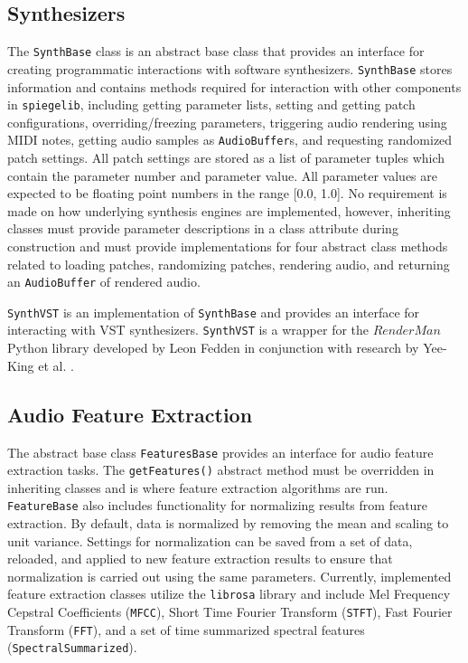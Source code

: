 \subsection{Synthesizers}
The \texttt{SynthBase} class is an abstract base class that provides an interface for creating programmatic interactions with software synthesizers. \texttt{SynthBase} stores information and contains methods required for interaction with other components in \texttt{spiegelib}, including getting parameter lists, setting and getting patch configurations, overriding/freezing parameters, triggering audio rendering using MIDI notes, getting audio samples as \texttt{AudioBuffer}s, and requesting randomized patch settings. All patch settings are stored as a list of parameter tuples which contain the parameter number and parameter value. All parameter values are expected to be floating point numbers in the range [0.0, 1.0]. No requirement is made on how underlying synthesis engines are implemented, however, inheriting classes must provide parameter descriptions in a class attribute during construction and must provide implementations for four abstract class methods related to loading patches, randomizing patches, rendering audio, and returning an \texttt{AudioBuffer} of rendered audio.

%

\texttt{SynthVST} is an implementation of \texttt{SynthBase} and provides an interface for interacting with VST synthesizers. \texttt{SynthVST} is a wrapper for the $RenderMan$ Python library developed by Leon Fedden in conjunction with research by Yee-King et al. \cite{yee2018automatic}.

\subsection{Audio Feature Extraction}
The abstract base class \texttt{FeaturesBase} provides an interface for audio feature extraction tasks. 
The \texttt{getFeatures()} abstract method must be overridden in inheriting classes and is where feature extraction algorithms are run.  \texttt{FeatureBase} also includes functionality for normalizing results from feature extraction. By default, data is normalized by removing the mean and scaling to unit variance. Settings for normalization can be saved from a set of data, reloaded, and applied to new feature extraction results to ensure that normalization is carried out using the same parameters. Currently, implemented feature extraction classes utilize the \texttt{librosa} library \cite{mcfee2015librosa} and include Mel Frequency Cepstral Coefficients (\texttt{MFCC}), Short Time Fourier Transform (\texttt{STFT}), Fast Fourier Transform (\texttt{FFT}), and a set of time summarized spectral features (\texttt{SpectralSummarized}).

